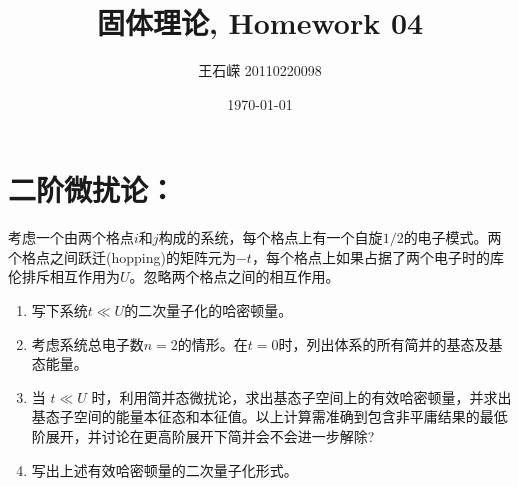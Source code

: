 \documentclass[a4paper]{article}
\title{固体理论, Homework 04}
\author{王石嵘 20110220098}
\date{\today} %
\numberwithin{equation}{section}
\begin{document}
\maketitle





\section{二阶微扰论：}
考虑一个由两个格点$  i  $和$  j  $构成的系统，每个格点上有一个自旋$  1/2  $的电子模式。两个格点之间跃迁(hopping)的矩阵元为$  −t $，每个格点上如果占据了两个电子时的库伦排斥相互作用为$  U $。忽略两个格点之间的相互作用。

\begin{enumerate}
	\item 写下系统$ t \ll U $的二次量子化的哈密顿量。
	\item 考虑系统总电子数$  n = 2  $的情形。在$  t = 0  $时，列出体系的所有简并的基态及基态能量。
	\item 当 $ t \ll U $ 时，利用简并态微扰论，求出基态子空间上的有效哈密顿量，并求出基态子空间的能量本征态和本征值。以上计算需准确到包含非平庸结果的最低阶展开，并讨论在更高阶展开下简并会不会进一步解除?
	\item 写出上述有效哈密顿量的二次量子化形式。
\end{enumerate}
\end{document}
